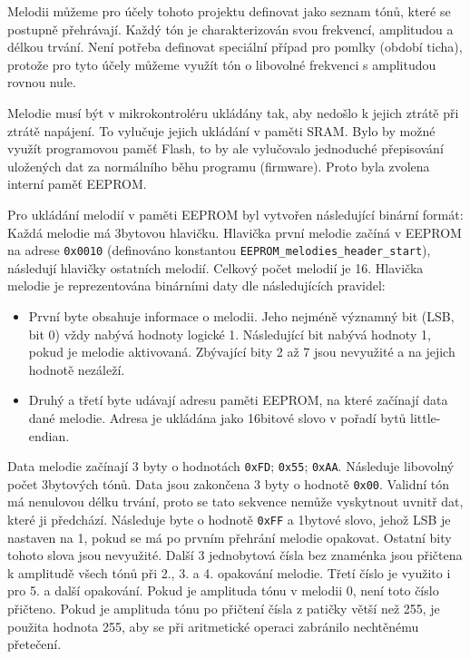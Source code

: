 Melodii můžeme pro účely tohoto projektu definovat jako seznam tónů, které se
postupně přehrávají. Každý tón je charakterizován svou frekvencí, amplitudou
a délkou trvání. Není potřeba definovat speciální případ pro pomlky (období
ticha), protože pro tyto účely můžeme využít tón o libovolné frekvenci
s amplitudou rovnou nule.

Melodie musí být v mikrokontroléru ukládány tak, aby nedošlo k jejich ztrátě
při ztrátě napájení. To vylučuje jejich ukládání v paměti SRAM. Bylo by možné
využít programovou paměť Flash, to by ale vylučovalo jednoduché přepisování
uložených dat za normálního běhu programu (firmware). Proto byla zvolena
interní paměť EEPROM.

Pro ukládání melodií v paměti EEPROM byl vytvořen následující binární formát:
Každá melodie má 3bytovou hlavičku. Hlavička první melodie začíná v EEPROM na
adrese \texttt{0x0010} (definováno konstantou
\verb|EEPROM_melodies_header_start|), následují hlavičky ostatních melodií.
Celkový počet melodií je 16. Hlavička melodie je reprezentována binárními daty
dle následujících pravidel:
\begin{itemize}[nosep]
    \item První byte obsahuje informace o melodii. Jeho nejméně významný bit
        (LSB, bit 0) vždy nabývá hodnoty logické 1. Následující bit nabývá
        hodnoty 1, pokud je melodie aktivovaná. Zbývající bity 2 až 7 jsou
        nevyužité a na jejich hodnotě nezáleží.
    \item Druhý a třetí byte udávají adresu paměti EEPROM, na které začínají
        data dané melodie. Adresa je ukládána jako 16bitové slovo v pořadí bytů
        little-endian.
\end{itemize}

Data melodie začínají 3 byty o hodnotách \texttt{0xFD}; \texttt{0x55};
\texttt{0xAA}. Následuje libovolný počet 3bytových tónů. Data jsou zakončena 3
byty o hodnotě \texttt{0x00}. Validní tón má nenulovou délku trvání, proto se
tato sekvence nemůže vyskytnout uvnitř dat, které ji předchází. Následuje byte
o hodnotě \texttt{0xFF} a 1bytové slovo, jehož LSB je nastaven na 1, pokud se
má po prvním přehrání melodie opakovat. Ostatní bity tohoto slova jsou
nevyužité. Další 3 jednobytová čísla bez znaménka jsou přičtena k amplitudě
všech tónů při 2., 3. a 4. opakování melodie. Třetí číslo je využito i pro 5.
a další opakování. Pokud je amplituda tónu v melodii 0, není toto číslo
přičteno. Pokud je amplituda tónu po přičtení čísla z patičky větší než
\num{255}, je použita hodnota \num{255}, aby se při aritmetické operaci
zabránilo nechtěnému přetečení.

